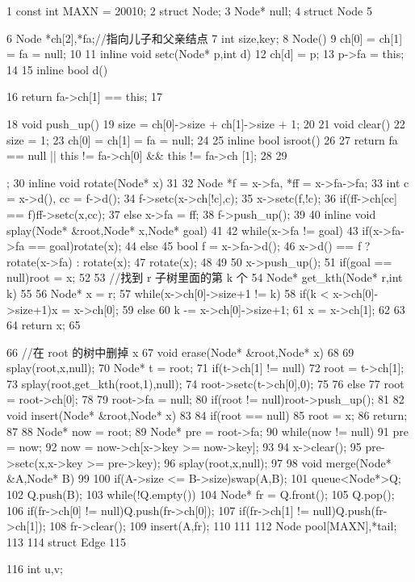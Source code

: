 \documentclass[11pt]{article}
\begin{document}
\begin{Code}
 1    const int MAXN = 20010;
 2    struct Node;
 3    Node* null;
 4    struct Node
 5    {
 6        Node *ch[2],*fa;//指向儿子和父亲结点
 7        int size,key;
 8        Node(){
 9            ch[0] = ch[1] = fa = null;
10        }
11        inline void setc(Node* p,int d){
12            ch[d] = p;
13            p->fa = this;
14        }
15        inline bool d(){


16           return fa->ch[1] == this;
17       }
18       void push_up(){
19           size = ch[0]->size + ch[1]->size + 1;
20       }
21       void clear(){
22           size = 1;
23           ch[0] = ch[1] = fa = null;
24       }
25       inline bool isroot()
26       {
27           return fa == null || this != fa->ch[0] && this != fa->ch
                [1];
28       }
29   };
30   inline void rotate(Node* x)
31   {
32       Node *f = x->fa, *ff = x->fa->fa;
33       int c = x->d(), cc = f->d();
34       f->setc(x->ch[!c],c);
35       x->setc(f,!c);
36       if(ff->ch[cc] == f)ff->setc(x,cc);
37       else x->fa = ff;
38       f->push_up();
39   }
40   inline void splay(Node* &root,Node* x,Node* goal)
41   {
42       while(x->fa != goal){
43           if(x->fa->fa == goal)rotate(x);
44           else {
45               bool f = x->fa->d();
46               x->d() == f ? rotate(x->fa) : rotate(x);
47               rotate(x);
48           }
49       }
50       x->push_up();
51       if(goal == null)root = x;
52   }
53   //找到 r 子树里面的第 k 个
54   Node* get_kth(Node* r,int k)
55   {
56       Node* x = r;
57       while(x->ch[0]->size+1 != k){
58           if(k < x->ch[0]->size+1)x = x->ch[0];
59           else {
60               k -= x->ch[0]->size+1;
61               x = x->ch[1];
62           }
63       }
64       return x;
65   }


 66   //在 root 的树中删掉 x
 67   void erase(Node* &root,Node* x)
 68   {
 69       splay(root,x,null);
 70       Node* t = root;
 71       if(t->ch[1] != null){
 72           root = t->ch[1];
 73           splay(root,get_kth(root,1),null);
 74           root->setc(t->ch[0],0);
 75       }
 76       else{
 77           root = root->ch[0];
 78       }
 79       root->fa = null;
 80       if(root != null)root->push_up();
 81   }
 82   void insert(Node* &root,Node* x)
 83   {
 84       if(root == null){
 85           root = x;
 86           return;
 87       }
 88       Node* now = root;
 89       Node* pre = root->fa;
 90       while(now != null){
 91           pre = now;
 92           now = now->ch[x->key >= now->key];
 93       }
 94       x->clear();
 95       pre->setc(x,x->key >= pre->key);
 96       splay(root,x,null);
 97   }
 98   void merge(Node* &A,Node* B)
 99   {
100       if(A->size <= B->size)swap(A,B);
101       queue<Node*>Q;
102       Q.push(B);
103       while(!Q.empty()){
104           Node* fr = Q.front();
105           Q.pop();
106           if(fr->ch[0] != null)Q.push(fr->ch[0]);
107           if(fr->ch[1] != null)Q.push(fr->ch[1]);
108           fr->clear();
109           insert(A,fr);
110       }
111   }
112   Node pool[MAXN],*tail;
113
114   struct Edge
115   {
116       int u,v;


}
\end{Code}
\end{document}
